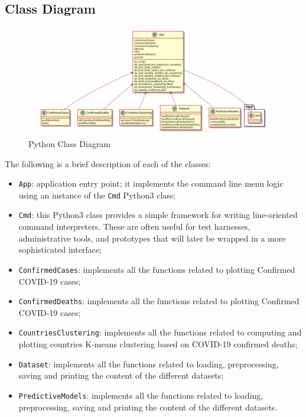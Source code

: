 \documentclass[11pt,a4paper]{article}
\begin{document}
\subsection{Class Diagram}
\begin{figure}[H]
    \begin{center}
        \includegraphics[scale=0.8]{img/class_diagram.pdf}
    \end{center}
    \caption{Python Class Diagram}
\end{figure}
The following is a brief description of each of the classes:
\begin{itemize}
    \item \texttt{App}: application entry point; it implements the command line
    menu logic using an instance of the \texttt{Cmd} Python3 class;
    \item \texttt{Cmd}: this Python3 class provides a simple framework for
    writing line-oriented command interpreters. These are often useful for test
    harnesses, administrative tools, and prototypes that will later be wrapped
    in a more sophisticated interface;
    \item \texttt{ConfirmedCases}: implements all the functions related to
    plotting Confirmed COVID-19 cases;
    \item \texttt{ConfirmedDeaths}: implements all the functions related to
    plotting Confirmed COVID-19 cases;
    \item \texttt{CountriesClustering}: implements all the functions related to
    computing and plotting countries K-means clustering based on COVID-19
    confirmed deaths;
    \item \texttt{Dataset}: implements all the functions related to loading,
    preprocessing, saving and printing the content of the different datasets;
    \item \texttt{PredictiveModels}: implements all the functions related to
    loading, preprocessing, saving and printing the content of the different
    datasets.
\end{itemize}
\end{document}
